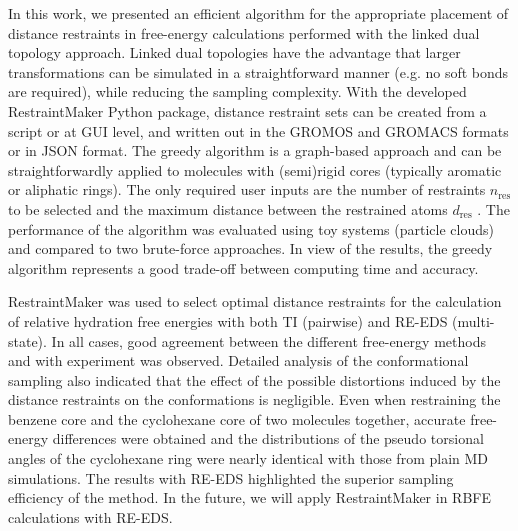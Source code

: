 In this work, we presented an efficient algorithm for the appropriate placement of distance restraints in free-energy calculations performed with the linked dual topology approach. Linked dual topologies have the advantage that larger transformations can be simulated in a straightforward manner (e.g. no soft bonds are required), while reducing the sampling complexity. 
With the developed RestraintMaker Python package, distance restraint sets can be created from a script or at GUI level, and written out in the GROMOS and GROMACS formats or in JSON format.
The greedy algorithm is a graph-based approach and can be straightforwardly applied to molecules with (semi)rigid cores (typically aromatic or aliphatic rings). The only required user inputs are the number of restraints $n_\text{res}$ to be selected and the maximum distance between the restrained atoms $d_\text{res}$ .
The performance of the algorithm was evaluated using toy systems (particle clouds) and compared to two brute-force approaches. In view of the results, the greedy algorithm represents a good trade-off between computing time and accuracy.

RestraintMaker was used to select optimal distance restraints for the calculation of relative hydration free energies with both TI (pairwise) and RE-EDS (multi-state). In all cases, good agreement between the different free-energy methods and with experiment was observed. Detailed analysis of the conformational sampling also indicated that the effect of the possible distortions induced by the distance restraints on the conformations is negligible. Even when restraining the benzene core and the cyclohexane core of two molecules together, accurate free-energy differences were obtained and the distributions of the pseudo torsional angles of the cyclohexane ring were nearly identical with those from plain MD simulations.
The results with RE-EDS highlighted the superior sampling efficiency of the method. In the future, we will apply RestraintMaker in RBFE calculations with RE-EDS.


